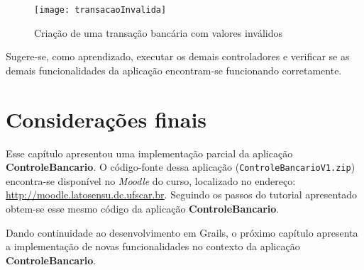 \begin{figure}[htbp]
\centering\texttt{[image: transacaoInvalida]}
\caption{Criação de uma transação bancária com valores inválidos}
\label{transacaoInvalidaFig}
\end{figure}

\vspace{0.5cm}

\begin{remark}
Sugere-se, como aprendizado, executar os  demais controladores e verificar se as
demais funcionalidades da aplicação encontram-se funcionando corretamente.
\end{remark}

\section{Considerações finais}

\vspace{0.3cm}

Esse   capítulo  apresentou   uma  implementação   parcial  da   aplicação  {\bf
  ControleBancario}.         O        código-fonte        dessa        aplicação
({\footnotesize\texttt{ControleBancarioV1.zip}}) encontra-se  disponível no {\it
  Moodle}         do        curso,        localizado         no        endereço:
{\footnotesize\url{http://moodle.latosensu.dc.ufscar.br}}. Seguindo os passos do
tutorial   apresentado   obtem-se   esse   mesmo  código   da   aplicação   {\bf
  ControleBancario}.  

Dando continuidade ao desenvolvimento em Grails, o próximo capítulo apresenta a
implementação   de  novas   funcionalidades  no   contexto  da   aplicação  {\bf
  ControleBancario}.  



